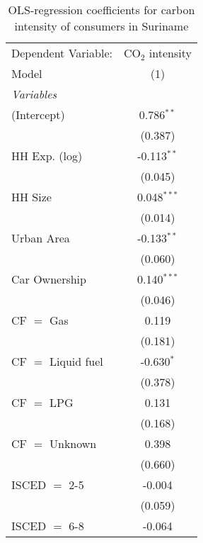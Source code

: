 
\begin{table}[htbp!]
   \centering
   \small
   \begin{adjustbox}{width = 1\textwidth, max height = 0.95\textheight, center}
      \begin{threeparttable}[b]
         \caption{\label{tab:OLS_1_SUR} OLS-regression coefficients for carbon intensity of consumers in Suriname}
         \begin{tabular}{lc}
            \tabularnewline \midrule \midrule
            Dependent Variable: & CO$_{2}$ intensity\\  
            Model               & (1)\\  
            \midrule
            \emph{Variables}\\
            (Intercept)         & 0.786$^{**}$\\   
                                & (0.387)\\   
            HH Exp. (log)       & -0.113$^{**}$\\   
                                & (0.045)\\   
            HH Size             & 0.048$^{***}$\\   
                                & (0.014)\\   
            Urban Area          & -0.133$^{**}$\\   
                                & (0.060)\\   
            Car Ownership       & 0.140$^{***}$\\   
                                & (0.046)\\   
            CF $=$ Gas          & 0.119\\   
                                & (0.181)\\   
            CF $=$ Liquid fuel  & -0.630$^{*}$\\   
                                & (0.378)\\   
            CF $=$ LPG          & 0.131\\   
                                & (0.168)\\   
            CF $=$ Unknown      & 0.398\\   
                                & (0.660)\\   
            ISCED $=$ 2-5       & -0.004\\   
                                & (0.059)\\   
            ISCED $=$ 6-8       & -0.064\\   

\end{tabular}
\end{threeparttable}
\end{adjustbox}
\end{table}
